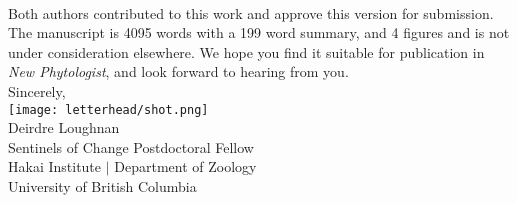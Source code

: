 \documentclass[11pt,a4paper]{article}
\begin{document}
\vspace{1.5ex}\\
\noindent Both authors contributed to this work and approve this version for submission. The manuscript is 4095 words with a 199 word summary, and 4 figures and is not under consideration elsewhere. We hope you find it suitable for publication in \emph{New Phytologist}, and look forward to hearing from you. 
\vspace{1.5ex}\\
\noindent Sincerely, \\
\texttt{[image: letterhead/shot.png]} \\ 
\noindent Deirdre Loughnan\\
\noindent Sentinels of Change Postdoctoral Fellow\\ %
\noindent Hakai Institute $|$ Department of Zoology\\
\noindent University of British Columbia
\newpage
\vspace{-5ex}

\begingroup
\renewcommand{\section}[2]{}
% 

\endgroup
\newpage
\end{document}
